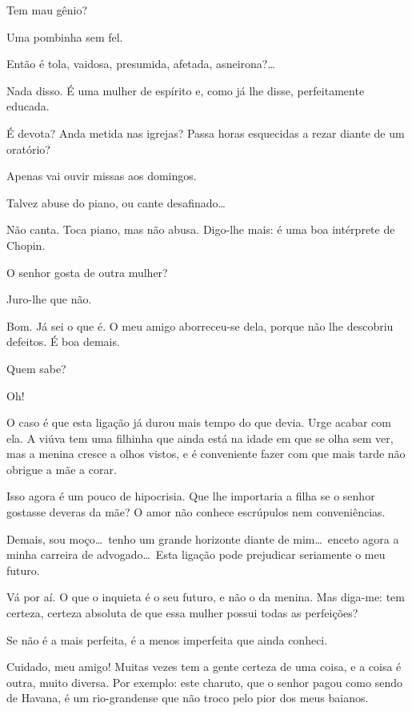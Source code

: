   Tem mau gênio?

  Uma pombinha sem fel.

  Então é tola, vaidosa, presumida, afetada,
asneirona?\ldots

   Nada
disso. É uma mulher de espírito e, como já lhe disse, perfeitamente
educada.

  É devota? Anda metida nas igrejas? Passa
horas esquecidas a rezar diante de um oratório?

  Apenas vai ouvir missas aos domingos.

  Talvez abuse do piano, ou cante
desafinado\ldots

  Não canta. Toca piano, mas não abusa.
Digo{}-lhe mais: é uma boa intérprete de Chopin.

  O senhor gosta de outra mulher?

  Juro{}-lhe que não.

  Bom. Já sei o que é. O meu amigo
aborreceu{}-se dela, porque não lhe descobriu defeitos. É boa demais.

  Quem sabe?

  Oh!

  O caso é que esta ligação já durou mais tempo
do que devia. Urge acabar com ela. A viúva tem uma filhinha que ainda
está na idade em que se olha sem ver, mas a menina cresce a olhos
vistos, e é conveniente fazer com que mais tarde não obrigue a mãe a
corar.

  Isso agora é um pouco de hipocrisia. Que
lhe importaria a filha se o senhor gostasse deveras da mãe? O amor não
conhece escrúpulos nem conveniências.

  Demais, sou moço\ldots\ tenho um grande horizonte
diante de mim\ldots\ enceto agora a minha carreira de advogado\ldots\ Esta
ligação pode prejudicar seriamente o meu futuro.

  Vá por aí. O que o inquieta é o seu
futuro, e não o da menina. Mas diga{}-me: tem certeza, certeza absoluta
de que essa mulher possui todas as perfeições?

  Se não é a mais perfeita, é a menos
imperfeita que ainda conheci.

  Cuidado, meu amigo! Muitas vezes tem a gente certeza de uma
coisa, e a coisa é outra, muito diversa. Por exemplo: este charuto, que
o senhor pagou como sendo de Havana, é um rio{}-grandense que não troco
pelo pior dos meus baianos. 

